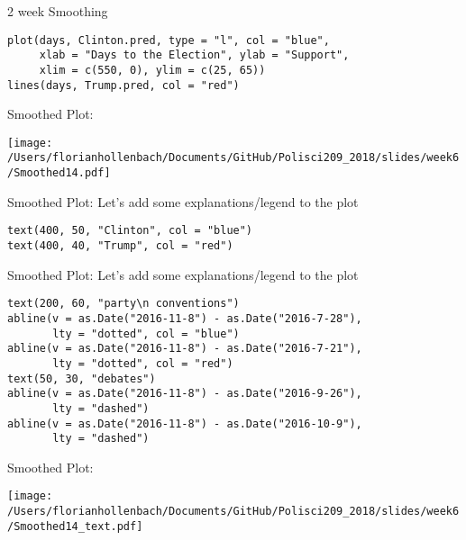 \documentclass[presentation]{beamer}
\begin{document}
\begin{frame}[fragile,label={sec:org4d400d9}]{2 week Smoothing}
 \begin{verbatim}
plot(days, Clinton.pred, type = "l", col = "blue",
     xlab = "Days to the Election", ylab = "Support",
     xlim = c(550, 0), ylim = c(25, 65))
lines(days, Trump.pred, col = "red")
\end{verbatim}
\end{frame}


\begin{frame}[label={sec:orge751b15}]{Smoothed Plot:}
\begin{center}
\texttt{[image: /Users/florianhollenbach/Documents/GitHub/Polisci209\_2018/slides/week6/Smoothed14.pdf]}
\end{center}
\end{frame}


\begin{frame}[fragile,label={sec:orgf8438dc}]{Smoothed Plot:}
 Let's add some explanations/legend to the plot

\begin{verbatim}
text(400, 50, "Clinton", col = "blue")
text(400, 40, "Trump", col = "red")
\end{verbatim}
\end{frame}


\begin{frame}[fragile,shrink=25,label={sec:orgf3d9d7f}]{Smoothed Plot:}
 Let's add some explanations/legend to the plot

\begin{verbatim}
text(200, 60, "party\n conventions")
abline(v = as.Date("2016-11-8") - as.Date("2016-7-28"),
       lty = "dotted", col = "blue")
abline(v = as.Date("2016-11-8") - as.Date("2016-7-21"),
       lty = "dotted", col = "red")
text(50, 30, "debates")
abline(v = as.Date("2016-11-8") - as.Date("2016-9-26"),
       lty = "dashed")
abline(v = as.Date("2016-11-8") - as.Date("2016-10-9"),
       lty = "dashed")
\end{verbatim}
\end{frame}



\begin{frame}[label={sec:org599fba9}]{Smoothed Plot:}
\begin{center}
\texttt{[image: /Users/florianhollenbach/Documents/GitHub/Polisci209\_2018/slides/week6/Smoothed14\_text.pdf]}
\end{center}
\end{frame}
\end{document}
